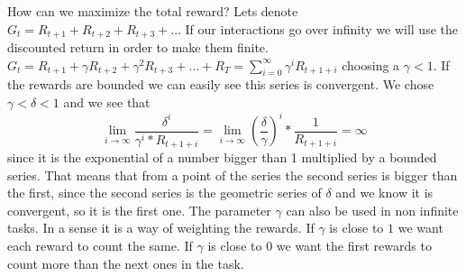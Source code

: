 \documentclass{article}
\begin{document}
\newline
How can we maximize the total reward? 
\newline Lets denote $G_{t} = R_{t+1} + R_{t+2} + R_{t+3} + \dots $ If our interactions go over infinity we will use the discounted return in order to make them finite.\newline
$G_{t} = R_{t+1} + \gamma R_{t+2} + \gamma^{2} R_{t+3} + \dots + R_{T} = \sum_{i = 0}^{\infty}\gamma^{i} R_{t+1+i} $ choosing a $\gamma < 1$. If the rewards are bounded we can easily see this series is convergent. We chose $\gamma < \delta < 1$ and we see that $$\lim_{i\to\infty}\frac{\delta^{i}}{\gamma^{i}*R_{t+1+i}} = \lim_{i\to\infty}(\frac{\delta}{\gamma})^{i} * \frac{1}{R_{t+1+i}} = \infty$$ since it is the exponential of a number bigger than 1 multiplied by a bounded series. That means that from a point of the series the second series is bigger than the first, since the second series is the geometric series of $\delta$ and we know it is convergent, so it is the first one.
\newline
The parameter $\gamma$ can also be used in non infinite tasks. In a sense it is a way of weighting the rewards. If $\gamma$ is close to $ 1$ we want each reward to count the same. If $\gamma$ is close to $0$ we want the first rewards to count more than the next ones in the task.
\end{document}
